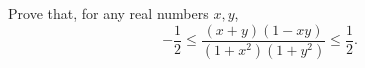 Prove that, for any real numbers $x, y$,
\[ -\frac{1}{2} \leq \frac{(x + y)(1 - xy)}{(1 + x^2)(1 + y^2)} \leq \frac{1}{2}. \]
